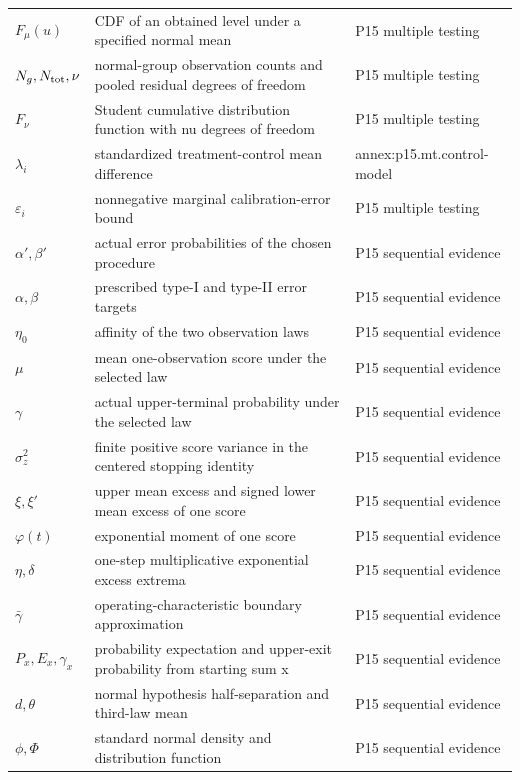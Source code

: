 \begin{longtable}{@{}p{}p{}p{}@{}}
\(F_\mu(u)\) & CDF of an obtained level under a specified normal mean & P15 multiple testing \\
\(N_g,\allowbreak N_{\rm tot},\allowbreak \nu\) & normal-group observation counts and pooled residual degrees of freedom & P15 multiple testing \\
\(F_\nu\) & Student cumulative distribution function with nu degrees of freedom & P15 multiple testing \\
\(\lambda_i\) & standardized treatment-control mean difference & annex:\allowbreak{}p15.\allowbreak{}mt.\allowbreak{}control-\allowbreak{}model \\
\(\varepsilon_i\) & nonnegative marginal calibration-error bound & P15 multiple testing \\
\(\alpha',\allowbreak \beta'\) & actual error probabilities of the chosen procedure & P15 sequential evidence \\
\(\alpha,\allowbreak \beta\) & prescribed type-I and type-II error targets & P15 sequential evidence \\
\(\eta_0\) & affinity of the two observation laws & P15 sequential evidence \\
\(\mu\) & mean one-observation score under the selected law & P15 sequential evidence \\
\(\gamma\) & actual upper-terminal probability under the selected law & P15 sequential evidence \\
\(\sigma_z^2\) & finite positive score variance in the centered stopping identity & P15 sequential evidence \\
\(\xi,\allowbreak \xi'\) & upper mean excess and signed lower mean excess of one score & P15 sequential evidence \\
\(\varphi(t)\) & exponential moment of one score & P15 sequential evidence \\
\(\eta,\allowbreak \delta\) & one-step multiplicative exponential excess extrema & P15 sequential evidence \\
\(\bar\gamma\) & operating-characteristic boundary approximation & P15 sequential evidence \\
\(P_x,\allowbreak E_x,\allowbreak \gamma_x\) & probability expectation and upper-exit probability from starting sum x & P15 sequential evidence \\
\(d,\allowbreak \theta\) & normal hypothesis half-separation and third-law mean & P15 sequential evidence \\
\(\phi,\allowbreak \Phi\) & standard normal density and distribution function & P15 sequential evidence \\

\end{longtable}
